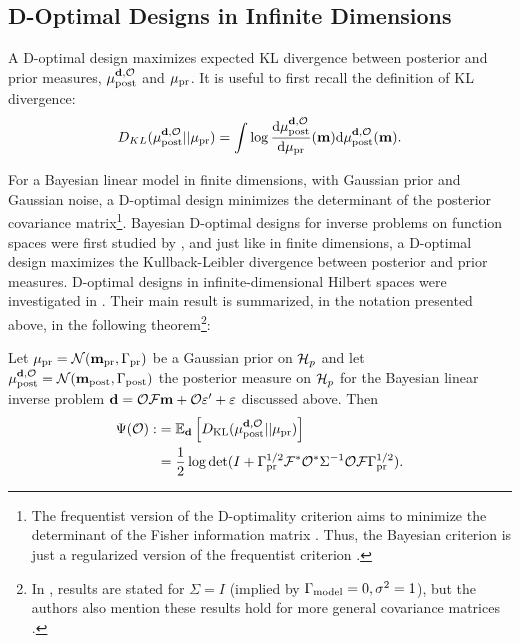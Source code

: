 \subsection{D-Optimal Designs in Infinite Dimensions}\label{subsec:D optimal design} 
A D-optimal design maximizes expected KL divergence between posterior
and prior measures, $\mu_{\textup{post}}^{\mathbf{d}, \mathcal{O}}$ and $\mu_{\textup{pr}}$. It is useful to first recall
the definition of KL divergence:%
$$
D_{KL}(\mu_{\textup{post}}^{\mathbf{d}, \mathcal{O}}||\mu_{\textup{pr}}) = \int \log \frac{\text{\textup{d}} \mu_{\textup{post}}^{\mathbf{d}, \mathcal{O}}}{\text{\textup{d}} \mu_{\textup{pr}}}(\mathbf{m}) \text{\textup{d}} \mu_{\textup{post}}^{\mathbf{d}, \mathcal{O}}(\mathbf{m}).
$$

For a Bayesian linear model in finite dimensions, with Gaussian prior
and Gaussian noise, a D-optimal design minimizes the determinant of
the posterior covariance matrix\footnote{The frequentist version of
the D-optimality criterion aims to minimize the determinant of the
Fisher information matrix \cite[page 16]{Ucinski05}. Thus, the
Bayesian criterion is just a regularized version of the frequentist
criterion \cite{Chaloner1995}.}. Bayesian D-optimal designs for
inverse problems on function spaces were first studied by
\cite{AlexanderianGloorGhattas14, AlexanderianPetraStadlerEtAl16,
  AlexanderianPetraStadlerEtAl14}, and just like in finite dimensions,
a D-optimal design maximizes the Kullback-Leibler divergence between
posterior and prior measures.
D-optimal designs in infinite-dimensional
Hilbert spaces were investigated in
\cite{AlexanderianGloorGhattas14}. Their main result is summarized, in
the notation presented above, in the following theorem\footnote{In
\cite{AlexanderianGloorGhattas14, alexanderian2018efficient}, results
are stated for $\Sigma=I$ (implied by $\Gamma_{\textup{model}} = 0,\sigma^2=1$), but
the authors also mention these results hold for more general
covariance matrices \cite[p. 681]{AlexanderianGloorGhattas14}.}:
\begin{theorem}\label{thm:d optimality}
  Let $\mu_{\textup{pr}} = \mathcal{N}(\mathbf{m}_{\textup{pr}},\Gamma_{\textup{pr}})$ be a Gaussian prior on $\mathcal{H}_p$
  and let $\mu_{\textup{post}}^{\mathbf{d}, \mathcal{O}} = \mathcal{N}(\mathbf{m}_{\textup{post}},\Gamma_{\textup{post}})$ the posterior measure
  on $\mathcal{H}_p$ for the Bayesian linear inverse problem $\mathbf{d} = \mathcal{O}
  \mathcal{F}\mathbf{m} + \mathcal{O} \varepsilon' + \varepsilon$ discussed above. Then
  \begin{align}\label{eq:objective}
    \begin{split}
      \tar( \obs) :&= \mathbb{E}_{\data}\left [ D_{\text{KL}} (\post || \pr ) \right ] \\
      &= \frac12 \log \det 
      ( I + \prcov^{1/2}  \fwd ^* \obs^* \Sigma^{-1} \obs \fwd \prcov^{1/2}).
    \end{split}
  \end{align}
\end{theorem}

